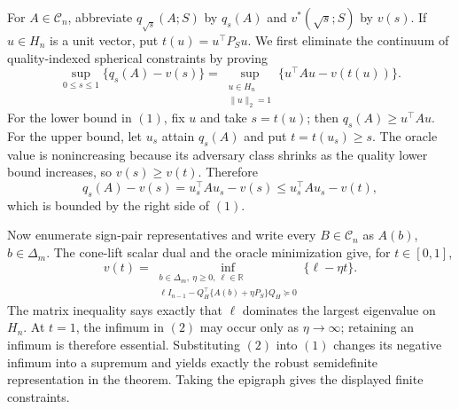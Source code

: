 For \(A\in\mathcal C_n\), abbreviate \(q_{\sqrt{s}}(A;S)\) by \(q_s(A)\) and \(v^*(\sqrt{s};S)\) by \(v(s)\).  If \(u\in H_n\) is a unit vector, put \(t(u)=u^\top P_Su\).  We first eliminate the continuum of quality-indexed spherical constraints by proving
\[
\sup_{0\leq s\leq1}\{q_s(A)-v(s)\}
=\sup_{\substack{u\in H_n\\\|u\|_2=1}}
\{u^\top Au-v(t(u))\}.
\tag{1}
\]
For the lower bound in \((1)\), fix \(u\) and take \(s=t(u)\); then \(q_s(A)\geq u^\top Au\).  For the upper bound, let \(u_s\) attain \(q_s(A)\) and put \(t=t(u_s)\geq s\).  The oracle value is nonincreasing because its adversary class shrinks as the quality lower bound increases, so \(v(s)\geq v(t)\).  Therefore
\[
q_s(A)-v(s)=u_s^\top Au_s-v(s)
\leq u_s^\top Au_s-v(t),
\]
which is bounded by the right side of \((1)\).

Now enumerate sign-pair representatives and write every \(B\in\mathcal C_n\) as \(A(b)\), \(b\in\Delta_m\).  The cone-lift scalar dual and the oracle minimization give, for \(t\in[0,1]\),
\[
v(t)=\inf_{\substack{b\in\Delta_m,\ \eta\geq0,\ \ell\in\mathbb R\\
\ell I_{n-1}-Q_H^\top\{A(b)+\eta P_S\}Q_H\succeq0}}
\{\ell-\eta t\}.
\tag{2}
\]
The matrix inequality says exactly that \(\ell\) dominates the largest eigenvalue on \(H_n\).  At \(t=1\), the infimum in \((2)\) may occur only as \(\eta\to\infty\); retaining an infimum is therefore essential.  Substituting \((2)\) into \((1)\) changes its negative infimum into a supremum and yields exactly the robust semidefinite representation in the theorem.  Taking the epigraph gives the displayed finite constraints.

